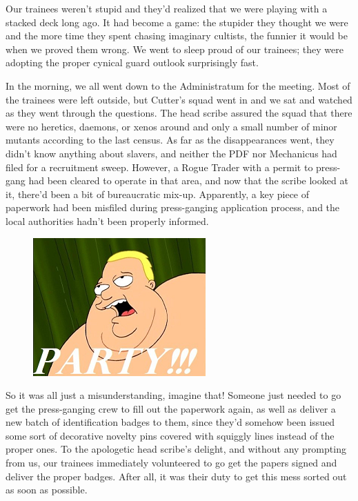 Our trainees weren’t stupid and they’d realized that we were playing with a stacked deck long ago. 
It had become a game: 
the stupider they thought we were and the more time they spent chasing imaginary cultists, the funnier it would be when we proved them wrong. 
We went to sleep proud of our trainees; 
they were adopting the proper cynical guard outlook surprisingly fast.

In the morning, we all went down to the Administratum for the meeting. 
Most of the trainees were left outside, but Cutter’s squad went in and we sat and watched as they went through the questions. 
The head scribe assured the squad that there were no heretics, daemons, or xenos around and only a small number of minor mutants according to the last census. 
As far as the disappearances went, they didn’t know anything about slavers, and neither the PDF nor Mechanicus had filed for a recruitment sweep. 
However, a Rogue Trader with a permit to press-gang had been cleared to operate in that area, and now that the scribe looked at it, there’d been a bit of bureaucratic mix-up. 
Apparently, a key piece of paperwork had been misfiled during press-ganging application process, and the local authorities hadn’t been properly informed.

\begin{figure}
	\begin{center}
		\includegraphics[width=\figwidth]{pics/8/32.png}
	\end{center}
\end{figure}
So it was all just a misunderstanding, imagine that! 
Someone just needed to go get the press-ganging crew to fill out the paperwork again, as well as deliver a new batch of identification badges to them, since they’d somehow been issued some sort of decorative novelty pins covered with squiggly lines instead of the proper ones. 
To the apologetic head scribe’s delight, and without any prompting from us, our trainees immediately volunteered to go get the papers signed and deliver the proper badges. 
After all, it was their duty to get this mess sorted out as soon as possible.


